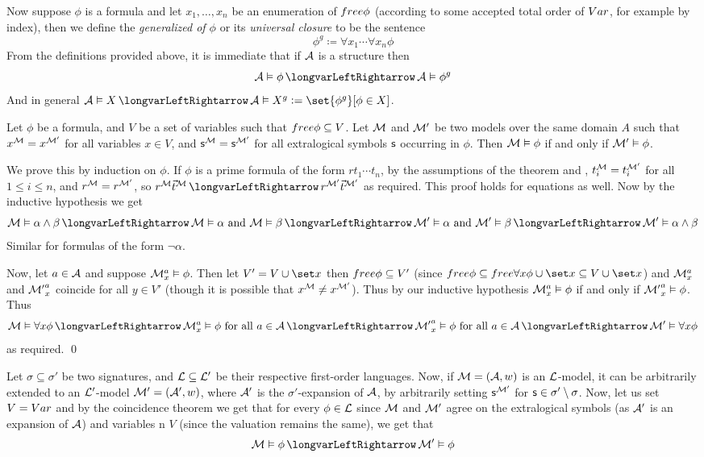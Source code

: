 Now suppose $\phi$ is a formula and let $x_1,\dots,x_n$ be an enumeration of ${\sl free}\phi$ (according to some accepted total order of ${\sl Var}$, for example by index), then we define the
{\it generalized of $\phi$} or its {\it universal closure} to be the sentence
$$ \phi^g \coloneqq \forall x_1\cdots\forall x_n\phi $$
From the definitions provided above, it is immediate that if ${\cal A}$ is a structure then
$$ {\cal A}\vDash\phi \iff {\cal A}\vDash\phi^g $$
And in general ${\cal A}\vDash X\iff{\cal A}\vDash X^g\coloneqq\set{\phi^g}[\phi\in X]$.

\bthrm[title=The Coincidence Theorem, name=coincidencetheorem]

    Let $\phi$ be a formula, and $V$ be a set of variables such that ${\sl free}\phi\subseteq V$.
    Let ${\cal M}$ and ${\cal M}'$ be two models over the same domain $A$ such that $x^{\cal M}=x^{{\cal M}'}$ for all variables $x\in V$, and ${\sf s}^{\cal M}={\sf s}^{\cal M'}$ for all extralogical
    symbols ${\sf s}$ occurring in $\phi$.
    Then ${\cal M}\vDash\phi$ if and only if ${\cal M}'\vDash\phi$.

\ethrm

We prove this by induction on $\phi$.
If $\phi$ is a prime formula of the form $rt_1\cdots t_n$, by the assumptions of the theorem and , $t_i^{\cal M}=t_i^{\cal M'}$ for all $1\leq i\leq n$, and
$r^{\cal M}=r^{\cal M'}$, so $r^{\cal M}\vec t^{\cal M}\iff r^{\cal M'}\vec t^{\cal M'}$ as required.
This proof holds for equations as well.
Now by the inductive hypothesis we get
$$ {\cal M}\vDash\alpha\land\beta \iff {\cal M}\vDash\alpha\hbox{ and }{\cal M}\vDash\beta \iff {\cal M}'\vDash\alpha\hbox{ and }{\cal M}'\vDash\beta \iff {\cal M}'\vDash\alpha\land\beta $$
Similar for formulas of the form $\neg\alpha$.

Now, let $a\in{\cal A}$ and suppose ${\cal M}^a_x\vDash\phi$.
Then let $V'=V\cup\set x$ then ${\sl free}\phi\subseteq V'$ (since $\free\phi\subseteq\free\forall x\phi\cup\set x\subseteq V\cup\set x$) and ${\cal M}^a_x$ and ${\cal M'}^a_x$ coincide for all $y\in V'$
(though it is possible that $x^{\cal M}\neq x^{\cal M'}$).
Thus by our inductive hypothesis ${\cal M}^a_x\vDash\phi$ if and only if ${\cal M'}^a_x\vDash\phi$.
Thus
$$ {\cal M}\vDash\forall x\phi \iff {\cal M}^a_x\vDash\phi\hbox{ for all $a\in{\cal A}$} \iff {\cal M'}^a_x\vDash\phi\hbox{ for all $a\in{\cal A}$} \iff {\cal M}'\vDash\forall x\phi $$
as required.
\qed

Let $\sigma\subseteq\sigma'$ be two signatures, and ${\cal L}\subseteq{\cal L'}$ be their respective first-order languages.
Now, if ${\cal M}=({\cal A},w)$ is an ${\cal L}$-model, it can be arbitrarily extended to an ${\cal L}'$-model ${\cal M}'=({\cal A}',w)$, where ${\cal A}'$ is the $\sigma'$-expansion of ${\cal A}$, by
arbitrarily setting ${\sf s}^{\cal M'}$ for ${\sf s}\in\sigma'\setminus\sigma$.
Now, let us set $V={\sl Var}$ and by the coincidence theorem we get that for every $\phi\in{\cal L}$ since ${\cal M}$ and ${\cal M}'$ agree on the extralogical symbols (as ${\cal A}'$ is an expansion of
${\cal A}$) and variables n $V$ (since the valuation remains the same), we get that
$$ {\cal M}\vDash\phi \iff {\cal M}'\vDash\phi $$

